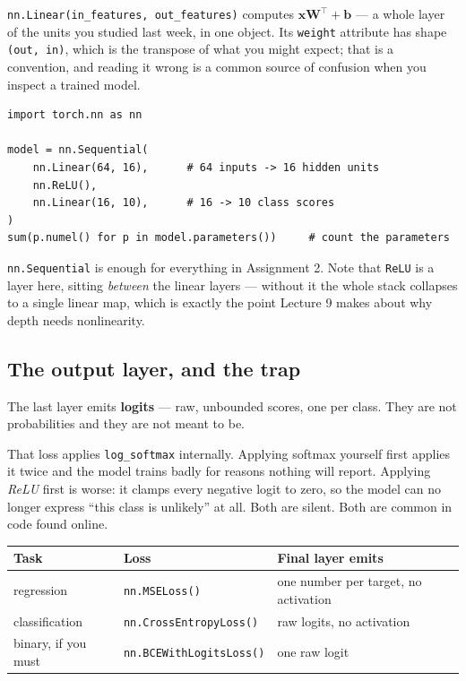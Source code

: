 \documentclass[11pt]{article}
\begin{document}
\texttt{nn.Linear(in\_features, out\_features)} computes
$\boldsymbol{x}\boldsymbol{W}^{\!\top} + \boldsymbol{b}$ --- a whole layer of the
units you studied last week, in one object. Its \texttt{weight} attribute has
shape \texttt{(out, in)}, which is the transpose of what you might expect; that
is a convention, and reading it wrong is a common source of confusion when you
inspect a trained model.

\begin{lstlisting}
import torch.nn as nn

model = nn.Sequential(
    nn.Linear(64, 16),      # 64 inputs -> 16 hidden units
    nn.ReLU(),
    nn.Linear(16, 10),      # 16 -> 10 class scores
)
sum(p.numel() for p in model.parameters())     # count the parameters
\end{lstlisting}

\texttt{nn.Sequential} is enough for everything in Assignment 2. Note that
\texttt{ReLU} is a layer here, sitting \emph{between} the linear layers ---
without it the whole stack collapses to a single linear map, which is exactly
the point Lecture 9 makes about why depth needs nonlinearity.

\subsection{The output layer, and the trap}

The last layer emits \textbf{logits} --- raw, unbounded scores, one per class.
They are not probabilities and they are not meant to be.

\begin{keybox}
 That loss applies \texttt{log\_softmax}
internally. Applying softmax yourself first applies it twice and the model
trains badly for reasons nothing will report. Applying \emph{ReLU} first is
worse: it clamps every negative logit to zero, so the model can no longer
express ``this class is unlikely'' at all. Both are silent. Both are common in
code found online.
\end{keybox}

\begin{center}
\begin{tabular}{@{}lll@{}}
\toprule
Task & Loss & Final layer emits \\
\midrule
regression & \texttt{nn.MSELoss()} & one number per target, no activation \\
classification & \texttt{nn.CrossEntropyLoss()} & raw logits, no activation \\
binary, if you must & \texttt{nn.BCEWithLogitsLoss()} & one raw logit \\
\bottomrule
\end{tabular}
\end{center}
\end{document}
